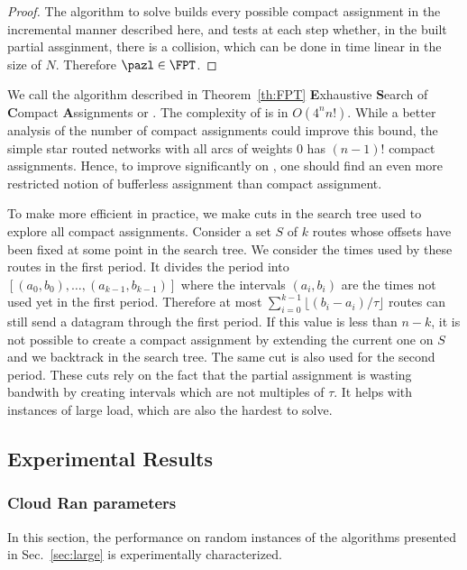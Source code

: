 \begin{proof}
The algorithm to solve \pazl builds every possible compact assignment in the incremental manner described here, and tests at each step whether, in the built partial assginment, there is a collision, which can be done in time linear in the size of $N$. Therefore $\pazl \in \FPT$.
\end{proof}


We call the algorithm described in Theorem~\ref{th:FPT} \textbf{E}xhaustive \textbf{S}earch of \textbf{C}ompact \textbf{A}ssignments or \ESCA. The complexity of \ESCA is in $O(4^n n!)$. While a better analysis of the number of compact assignments could improve this bound, the simple star routed networks with all arcs of weights $0$ has $(n-1)!$ compact assignments. Hence, to improve significantly on \ESCA, one should find an even more restricted notion of bufferless assignment than compact assignment.

To make \ESCA more efficient in practice, we make cuts in the search tree used to explore all compact assignments. Consider a set $S$ of $k$ routes whose offsets have been fixed at some point in the search tree. We consider the times used by these routes in the first period. It divides the period into $[(a_0,b_0), \dots, (a_{k-1},b_{k-1})]$ where the intervals $(a_i,b_i)$ are the times not used yet in the first period. Therefore at most $\displaystyle{ \sum_{i=0}^{k-1} \lfloor(b_{i} -a_i)/\tau\rfloor}$ routes can still send a datagram through the first period. If this value is less than $n - k$, it is not possible to create a compact assignment by extending the current one on $S$ and we backtrack in the search tree. The same cut is also used for the second period. These cuts rely on the fact that the partial assignment is wasting bandwith by creating intervals which are not multiples of $\tau$. It helps with instances of large load, which are also the hardest to solve.


\subsection{Experimental Results} \label{sec:perf_large}

\subsubsection{Cloud Ran parameters}\label{sec:pazlcran}
In this section, the performance on random instances of the algorithms presented in Sec.~\ref{sec:large} is experimentally characterized.

